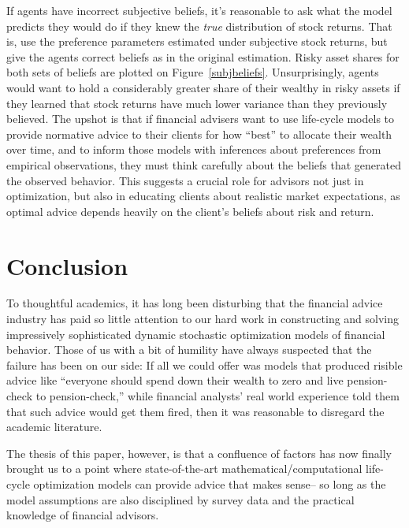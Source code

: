 \documentclass{article}
\begin{document}
If agents have incorrect subjective beliefs, it's reasonable to ask what the model predicts they would do if they knew the \textit{true} distribution of stock returns.
That is, use the preference parameters estimated under subjective stock returns, but give the agents correct beliefs as in the original estimation.
Risky asset shares for both sets of beliefs are plotted on Figure~\ref{subjbeliefs}.
Unsurprisingly, agents would want to hold a considerably greater share of their wealthy in risky assets if they learned that stock returns have much lower variance than they previously believed.
The upshot is that if financial advisers want to use life-cycle models to provide normative advice to their clients for how ``best'' to allocate their wealth over time, and to inform those models with inferences about preferences from empirical observations, they must think carefully about the beliefs that generated the observed behavior. This suggests a crucial role for advisors not just in optimization, but also in educating clients about realistic market expectations, as optimal advice depends heavily on the client's beliefs about risk and return.

\section{Conclusion}

To thoughtful academics, it has long been disturbing that the financial advice industry has paid so little attention to our hard work in constructing and solving impressively sophisticated dynamic stochastic optimization models of financial behavior.
Those of us with a bit of humility have always suspected that the failure has been on our side: If all we could offer was models that produced risible advice like ``everyone should spend down their wealth to zero and live pension-check to pension-check,'' while financial analysts' real world experience told them that such advice would get them fired, then it was reasonable to disregard the academic literature.

The thesis of this paper, however, is that a confluence of factors has now finally brought us to a point where state-of-the-art mathematical/computational life-cycle optimization models can provide advice that makes sense-- so long as the model assumptions are also disciplined by survey data and the practical knowledge of financial advisors.
\end{document}
